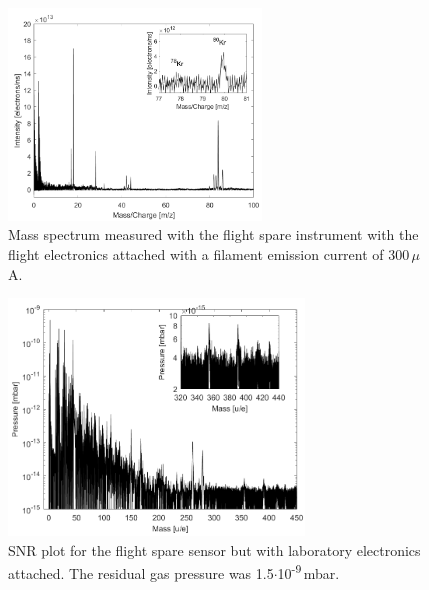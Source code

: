 		\begin{figure} %
			\centering
			\includegraphics[width = 0.6\textwidth]{Experiments/FS_thMode300uA.png}
			\caption{Mass spectrum measured with the flight spare instrument with the flight electronics attached with a filament emission current of 300\,$\mu$A.}
			\label{fig:ExpFSFlightElK78}
		\end{figure}
		
		\begin{figure}[h]
			\centering
			\includegraphics[width = 0.7\textwidth]{Experiments/FSLabSNRRestGasPressCal.png}
			\caption{SNR plot for the flight spare sensor but with laboratory electronics attached. The residual gas pressure was 1.5$\cdot$10\textsuperscript{-9}\,mbar.}
			\label{fig:ExpFSFlightSenSNR}
		\end{figure}
	
	
	
	
	
	
	